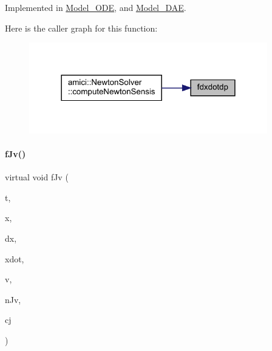 Implemented in \mbox{\hyperlink{classamici_1_1_model___o_d_e_afd60580b84c72713288796453f6da33a}{Model\+\_\+\+O\+DE}}, and \mbox{\hyperlink{classamici_1_1_model___d_a_e_afd60580b84c72713288796453f6da33a}{Model\+\_\+\+D\+AE}}.

Here is the caller graph for this function\+:
\nopagebreak
\begin{figure}[H]
\begin{center}
\leavevmode
\includegraphics[width=294pt]{classamici_1_1_abstract_model_a7ce1e14d4137c249bc44e18345b562b8_icgraph}
\end{center}
\end{figure}
\mbox{\label{classamici_1_1_abstract_model_ae08b9d7a7d15898e4dd7c71ac057c6a5}} 
\paragraph{\texorpdfstring{fJv()}{fJv()}}
{\footnotesize\ttfamily virtual void f\+Jv (\begin{DoxyParamCaption}\item[{\mbox{\hyperlink{namespaceamici_a1bdce28051d6a53868f7ccbf5f2c14a3}{realtype}}}]{t,  }\item[{\mbox{\hyperlink{classamici_1_1_ami_vector}{Ami\+Vector}} $\ast$}]{x,  }\item[{\mbox{\hyperlink{classamici_1_1_ami_vector}{Ami\+Vector}} $\ast$}]{dx,  }\item[{\mbox{\hyperlink{classamici_1_1_ami_vector}{Ami\+Vector}} $\ast$}]{xdot,  }\item[{\mbox{\hyperlink{classamici_1_1_ami_vector}{Ami\+Vector}} $\ast$}]{v,  }\item[{\mbox{\hyperlink{classamici_1_1_ami_vector}{Ami\+Vector}} $\ast$}]{n\+Jv,  }\item[{\mbox{\hyperlink{namespaceamici_a1bdce28051d6a53868f7ccbf5f2c14a3}{realtype}}}]{cj }\end{DoxyParamCaption})\hspace{0.3cm}{\ttfamily [pure virtual]}}

